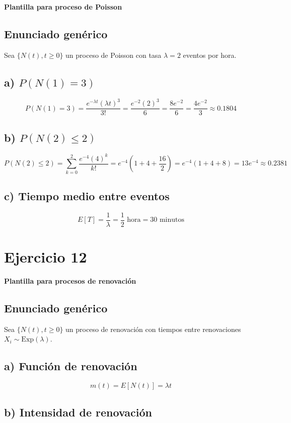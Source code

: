 \documentclass{article}
\begin{document}
\textbf{Plantilla para proceso de Poisson}

\subsection*{Enunciado genérico}
Sea \(\{N(t), t \geq 0\}\) un proceso de Poisson con tasa \(\lambda = 2\) eventos por hora.

\subsection*{a) \(P(N(1) = 3)\)}

\[
P(N(1) = 3) = \frac{e^{-\lambda t}(\lambda t)^3}{3!} = \frac{e^{-2}(2)^3}{6} = \frac{8e^{-2}}{6} = \frac{4e^{-2}}{3} \approx 0.1804
\]

\subsection*{b) \(P(N(2) \leq 2)\)}

\[
P(N(2) \leq 2) = \sum_{k=0}^{2} \frac{e^{-4}(4)^k}{k!} = e^{-4}\left(1 + 4 + \frac{16}{2}\right) = e^{-4}(1 + 4 + 8) = 13e^{-4} \approx 0.2381
\]

\subsection*{c) Tiempo medio entre eventos}

\[
E[T] = \frac{1}{\lambda} = \frac{1}{2} \text{ hora} = 30 \text{ minutos}
\]

\section*{Ejercicio 12}

\textbf{Plantilla para procesos de renovación}

\subsection*{Enunciado genérico}
Sea \(\{N(t), t \geq 0\}\) un proceso de renovación con tiempos entre renovaciones \(X_i \sim \text{Exp}(\lambda)\).

\subsection*{a) Función de renovación}

\[
m(t) = E[N(t)] = \lambda t
\]

\subsection*{b) Intensidad de renovación}
\end{document}
